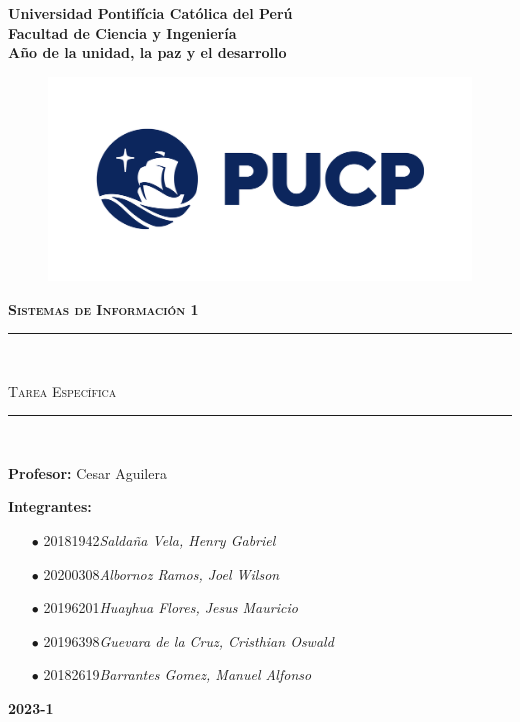 \begin{titlepage}
	\begin{center}
		{\Huge \textbf{Universidad Pontifícia Católica del Perú}}\\
		\vspace{3mm}
		{\Huge \textbf{Facultad de Ciencia y Ingeniería }}\\
		\vspace{1cm}
    {\Huge\textbf{Año de la unidad, la paz y el desarrollo}}\\
    \vspace{1cm}
		\begin{figure}[h]
			\centering
			\includegraphics[width=15cm]{cover/logo_PUCP.png}
		\end{figure}
		\vspace{5mm}
		{\LARGE \textbf{\textsc{Sistemas de Información 1}}}
		\vspace{2mm}
		\textcolor{PUCP}{\rule{\linewidth}{0.75mm}}\\
		\begin{spacing}{1}
			\LARGE\textsc{Tarea Específica}
		\end{spacing}
		\textcolor{PUCP}{\rule{\linewidth}{0.75mm}}\\
		
		\vspace{0.5cm}
		\begin{flushleft}
			{\Large\textbf{Profesor: } Cesar Aguilera}
			\vspace{2mm}
			
			{\Large\textbf{Integrantes:}}
			\begin{itemize}\Large
				\item[$ \bullet $] 20181942\dotfill\textsl{Saldaña Vela, Henry Gabriel}
				\item[$ \bullet $] 20200308\dotfill\textsl{Albornoz Ramos, Joel Wilson}
				\item[$ \bullet $] 20196201\dotfill\textsl{Huayhua Flores, Jesus Mauricio}
				\item[$ \bullet $] 20196398\dotfill\textsl{Guevara de la Cruz, Cristhian Oswald}
				\item[$ \bullet $] 20182619\dotfill\textsl{Barrantes Gomez, Manuel Alfonso}
			\end{itemize}
		\end{flushleft}
		\vfill
		{\Huge \textbf{2023-1}}
	\end{center}
\end{titlepage}